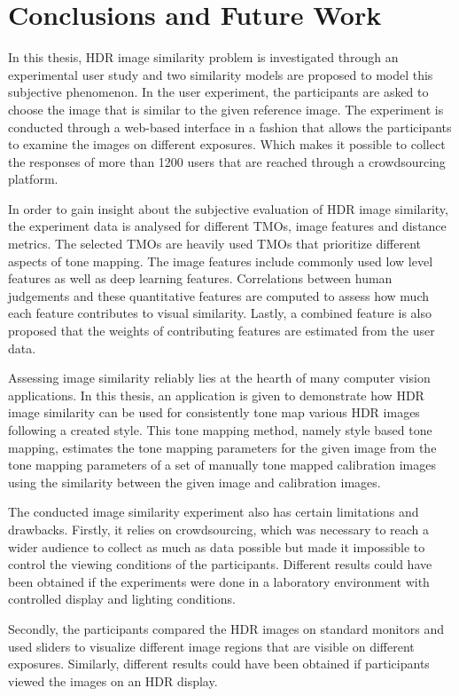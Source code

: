 \chapter{Conclusions and Future Work}
\label{chp:b8}

In this thesis, HDR image similarity problem is investigated through an experimental user study and two similarity models are proposed to model this subjective phenomenon. In the user experiment, the participants are asked to choose the image that is similar to the given reference image. The experiment is conducted through a web-based interface in a fashion that allows the participants to examine the images on different exposures. Which makes it possible to collect the responses of more than 1200 users that are reached through a crowdsourcing platform.

In order to gain insight about the subjective evaluation of HDR image similarity, the experiment data is analysed for different TMOs, image features and distance metrics. The selected TMOs are heavily used TMOs that prioritize different aspects of tone mapping. The image features include commonly used low level features as well as deep learning features. Correlations between human judgements and these quantitative features are computed to assess how much each feature contributes to visual similarity. Lastly, a combined feature is also proposed that the weights of contributing features are estimated from the user data.

Assessing image similarity reliably lies at the hearth of many computer vision applications. In this thesis, an application is given to demonstrate how HDR image similarity can be used for consistently tone map various HDR images following a created style. This tone mapping method, namely style based tone mapping, estimates the tone mapping parameters for the given image from the tone mapping parameters of a set of manually tone mapped calibration images using the similarity between the given image and calibration images. 

The conducted image similarity experiment also has certain limitations and drawbacks. Firstly, it relies on crowdsourcing, which was necessary to reach a wider audience to collect as much as data possible but made it impossible to control the viewing conditions of the participants. Different results could have been obtained if the experiments were done in a laboratory environment with controlled display and lighting conditions.

Secondly, the participants compared the HDR images on standard monitors and used sliders to visualize different image regions that are visible on different exposures. Similarly, different results could have been obtained if participants viewed the images on an HDR display. 

